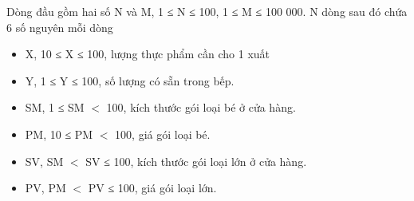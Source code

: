 Dòng đầu gồm hai số N và M, 1 ≤ N ≤ 100, 1 ≤ M ≤ 100 000. N dòng sau đó chứa 6 số nguyên mỗi dòng
\begin{itemize}
	\item X, 10 ≤ X ≤ 100, lượng thực phẩm cần cho 1 xuất
	\item Y, 1 ≤ Y ≤ 100, số lượng có sẵn trong bếp.
	\item SM, 1 ≤ SM $<$ 100, kích thước gói loại bé ở cửa hàng.
	\item PM, 10 ≤ PM $<$ 100, giá gói loại bé.
	\item SV, SM $<$ SV ≤ 100, kích thước gói loại lớn ở cửa hàng.
	\item PV, PM $<$ PV ≤ 100, giá gói loại lớn.
\end{itemize}

\